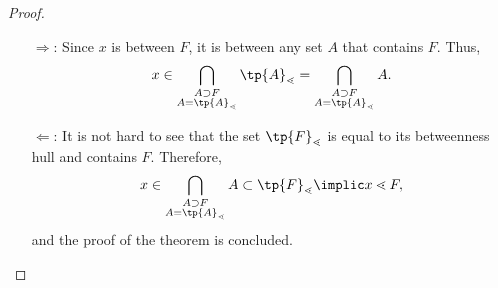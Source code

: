 \documentclass[12pt, a4paper]{article}
\newcommand{\btw}{\lessdot}
\begin{document}
\begin{proof}
\begin{itemize}
    \item[\(\Longrightarrow\):] Since \(x\) is between \(F\), it is between any set \(A\) that contains \(F\). Thus, \[x \in \bigcap\limits_{\substack{A \supset F \\ A = \tp{A}_\btw}} \tp{A}_\btw = \bigcap\limits_{\substack{A \supset F \\ A = \tp{A}_\btw}} A.\]
    \item[\(\Longleftarrow\):] It is not hard to see that the set \(\tp{F}_\btw\) is equal to its betweenness hull and contains \(F\). Therefore, \[x \in \bigcap\limits_{\substack{A \supset F \\ A = \tp{A}_\btw}} A \subset \tp{F}_\btw \implic x \btw F,\] and the proof of the theorem is concluded.
\end{itemize}
\end{proof}
\end{document}
